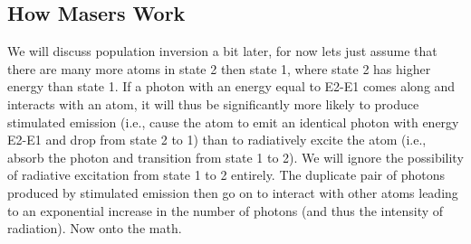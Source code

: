 \documentclass{article}
\begin{document}
\subsection{ How Masers Work }
We will discuss population inversion a bit later, for now lets just assume that there are many more atoms in state 2 then state 1, where state 2 has higher energy than state 1. If a photon with an energy equal to E2-E1 comes along and interacts with an atom, it will thus be significantly more likely to produce stimulated emission (i.e., cause the atom to emit an identical photon with energy E2-E1 and drop from state 2 to 1) than to radiatively excite the atom (i.e., absorb the photon and transition from state 1 to 2). We will ignore the possibility of radiative excitation from state 1 to 2 entirely. The duplicate pair of photons produced by stimulated emission then go on to interact with other atoms leading to an exponential increase in the number of photons (and thus the intensity of radiation). 
Now onto the math.
\end{document}
